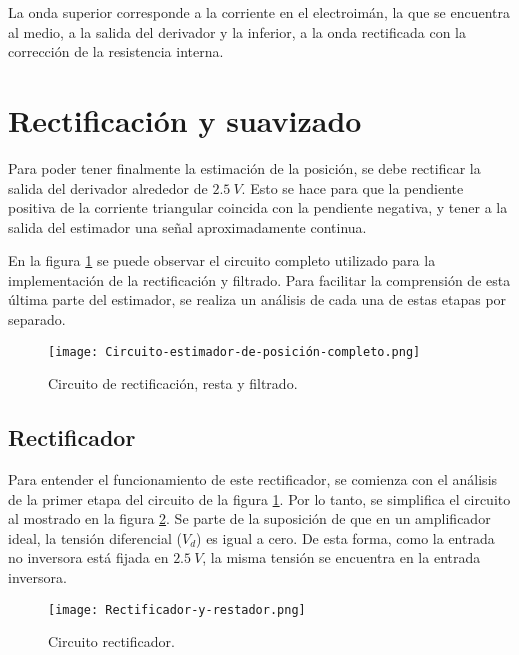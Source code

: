 \noindent La onda superior corresponde a la corriente en el electroim\'{a}n, la que se encuentra al medio, a la salida del derivador y la inferior, a la onda rectificada con la correcci\'{o}n de la resistencia interna.

\section{Rectificación y suavizado}

\noindent Para poder tener finalmente la estimaci\'{o}n de la posici\'{o}n, se debe rectificar la salida del derivador alrededor de $2.5\:V$. Esto se hace para que la pendiente positiva de la corriente triangular coincida con la pendiente negativa, y tener a la salida del estimador una se\~{n}al aproximadamente continua.

\noindent En la figura \ref{fig:img_Circuito_estimador_de_posición_completo} se puede observar el circuito completo utilizado para la implementaci\'{o}n de la rectificación y filtrado. Para facilitar la comprensión de esta última parte del estimador, se realiza un análisis de cada una de estas etapas por separado.

\begin{figure}[H]
	\centering
	\texttt{[image: Circuito-estimador-de-posición-completo.png]}
	\caption{Circuito de rectificación, resta y filtrado.}
	\label{fig:img_Circuito_estimador_de_posición_completo}
\end{figure}

\subsection{Rectificador}

\noindent Para entender el funcionamiento de este rectificador, se comienza con el análisis de la primer etapa del circuito de la figura \ref{fig:img_Circuito_estimador_de_posición_completo}. Por lo tanto, se simplifica el circuito al mostrado en la figura \ref{fig:img_Rectificador_y_restador}. Se parte de la suposici\'{o}n de que en un amplificador ideal, la tensi\'{o}n diferencial ($V_d$) es igual a cero. De esta forma, como la entrada no inversora est\'{a} fijada en $2.5\:V$, la misma tensi\'{o}n se encuentra en la entrada inversora.


\begin{figure}[H]
	\centering
	\texttt{[image: Rectificador-y-restador.png]}
	\caption{Circuito rectificador.}
	\label{fig:img_Rectificador_y_restador}
\end{figure}

